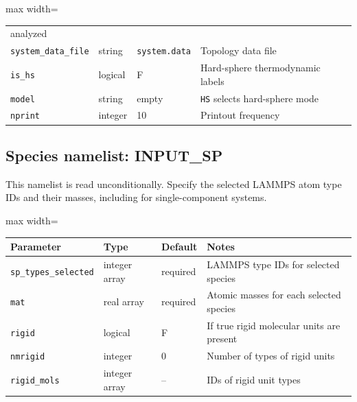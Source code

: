 \documentclass[final,1p,times]{elsarticle}
\begin{document}
\begin{center}
\begin{adjustbox}{max width=\textwidth}
\begin{tabular}{llll}
                               analyzed\\
\texttt{system\_data\_file} & string & \texttt{system.data} & Topology
                                                           data file\\
\texttt{is\_hs} & logical & F & Hard-sphere thermodynamic labels \\
\texttt{model} & string & empty & \texttt{HS} selects hard-sphere mode \\
\texttt{nprint} & integer & 10 & Printout frequency \\
\hline
\end{tabular}
\end{adjustbox}
\end{center}

\subsection{Species namelist: INPUT\_SP}
This namelist is read unconditionally. Specify the selected LAMMPS atom type IDs and their masses, including for single-component systems. 
\begin{center}
\begin{adjustbox}{max width=\textwidth}
\begin{tabular}{llll}
\hline
Parameter & Type & Default & Notes \\
\hline
\texttt{sp\_types\_selected} & integer array & required & LAMMPS type IDs for selected species \\
\texttt{mat} & real array & required & Atomic masses for each selected
                                  species \\
\texttt{rigid} & logical & F & If true rigid molecular units are present
  \\
\texttt{nmrigid} & integer & 0 & Number of types of rigid units \\
\texttt{rigid\_mols}& integer array & -- & IDs of rigid unit types \\
\hline
\end{tabular}
\end{adjustbox}
\end{center}
\end{document}
